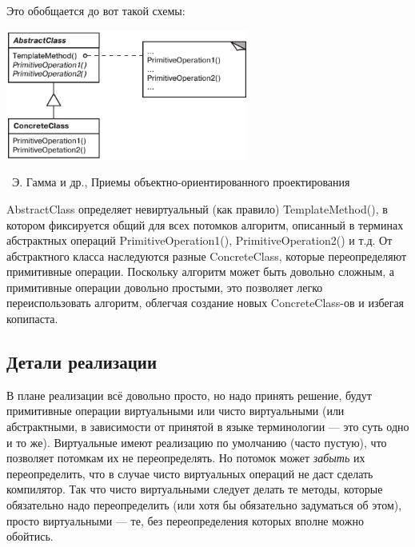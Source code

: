 \documentclass[a5paper]{article}
\newcommand{\attribution}[1] {
    \vspace{-5mm}\begin{flushright}\begin{scriptsize}%
    {\textcopyright\, #1}\end{scriptsize}\end{flushright}
}
\begin{document}
Это обобщается до вот такой схемы:

\begin{center}
    \includegraphics[width=0.6\textwidth]{templateMethod.png}
    \attribution{Э. Гамма и др., Приемы объектно-ориентированного проектирования}
\end{center}

AbstractClass определяет невиртуальный (как правило) TemplateMethod(), в котором фиксируется общий для всех потомков алгоритм, описанный в терминах абстрактных операций PrimitiveOperation1(), PrimitiveOperation2() и т.д. От абстрактного класса наследуются разные ConcreteClass, которые переопределяют примитивные операции. Поскольку алгоритм может быть довольно сложным, а примитивные операции довольно простыми, это позволяет легко переиспользовать алгоритм, облегчая создание новых ConcreteClass-ов и избегая копипаста.

\subsection{Детали реализации}

В плане реализации всё довольно просто, но надо принять решение, будут примитивные операции виртуальными или чисто виртуальными (или абстрактными, в зависимости от принятой в языке терминологии --- это суть одно и то же). Виртуальные имеют реализацию по умолчанию (часто пустую), что позволяет потомкам их не переопределять. Но потомок может \emph{забыть} их переопределить, что в случае чисто виртуальных операций не даст сделать компилятор. Так что чисто виртуальными следует делать те методы, которые обязательно надо переопределить (или хотя бы обязательно задуматься об этом), просто виртуальными --- те, без переопределения которых вполне можно обойтись.
\end{document}
